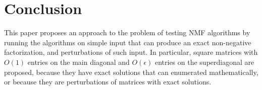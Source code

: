 \documentclass[conference]{IEEEtran}
\begin{document}
%






\section{Conclusion}
This paper proposes an approach to the problem of testing NMF algorithms by running the algorithms on simple input that can produce an exact non-negative factorization, and perturbations of such input.  In particular,  square matrices with $O(1)$ entries on the main diagonal and $ O(\epsilon)$ entries on the superdiagonal are proposed, because they have exact solutions that can enumerated mathematically, or because they are perturbations of matrices with exact solutions.
\end{document}
